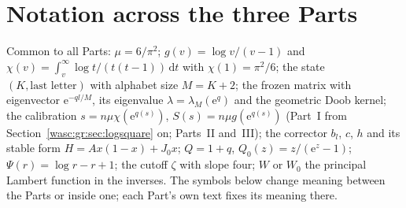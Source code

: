 \documentclass[11pt,a4paper]{article}
\theoremstyle{remark}\newtheorem{remark}[theorem]{Remark}
\newcommand{\dd}{\,\mathrm d}\newcommand{\ee}{\mathrm e}\newcommand{\Wc}{\mathcal W}
\numberwithin{equation}{section}
\begin{document}
\section*{Notation across the three Parts}\label{wasc:sec:notation}
Common to all Parts: $\mu=6/\pi^2$; $g(v)=\log v/(v-1)$ and $\chi(v)=\int_v^\infty\log t/(t(t-1))\dd t$ with $\chi(1)=\pi^2/6$; the state $(K,\text{last letter})$ with alphabet size $M=K+2$; the frozen matrix with eigenvector $\ee^{-ql/M}$, its eigenvalue $\lambda=\lambda_M(\ee^q)$ and the geometric Doob kernel; the calibration $s=n\mu\chi(\ee^{q(s)})$, $S(s)=n\mu g(\ee^{q(s)})$ (Part~I from Section~\ref{wasc:gr:sec:logsquare} on; Parts~II and~III); the corrector $b_l$, $c$, $h$ and its stable form $H=Ax(1-x)+J_0x$; $Q=1+q$, $Q_0(z)=z/(\ee^z-1)$; $\Psi(r)=\log r-r+1$; the cutoff $\zeta$ with slope four; $W$ or $W_0$ the principal Lambert function in the inverses. The symbols below change meaning between the Parts or inside one; each Part's own text fixes its meaning there.
\begingroup\small
\addtocounter{table}{-1}%
\end{document}
